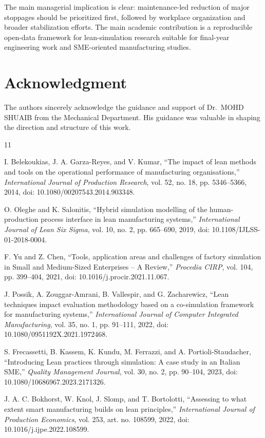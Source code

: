 \documentclass[conference]{IEEEtran}
\begin{document}
The main managerial implication is clear: maintenance-led reduction of major stoppages should be prioritized first, followed by workplace organization and broader stabilization efforts. The main academic contribution is a reproducible open-data framework for lean-simulation research suitable for final-year engineering work and SME-oriented manufacturing studies.

\section*{Acknowledgment}
The authors sincerely acknowledge the guidance and support of Dr.\ MOHD SHUAIB from the Mechanical Department. His guidance was valuable in shaping the direction and structure of this work.

\begin{thebibliography}{11}

I. Belekoukias, J. A. Garza-Reyes, and V. Kumar, ``The impact of lean methods and tools on the operational performance of manufacturing organisations,'' \emph{International Journal of Production Research}, vol. 52, no. 18, pp. 5346--5366, 2014, doi: 10.1080/00207543.2014.903348.

O. Oleghe and K. Salonitis, ``Hybrid simulation modelling of the human-production process interface in lean manufacturing systems,'' \emph{International Journal of Lean Six Sigma}, vol. 10, no. 2, pp. 665--690, 2019, doi: 10.1108/IJLSS-01-2018-0004.

F. Yu and Z. Chen, ``Tools, application areas and challenges of factory simulation in Small and Medium-Sized Enterprises -- A Review,'' \emph{Procedia CIRP}, vol. 104, pp. 399--404, 2021, doi: 10.1016/j.procir.2021.11.067.

J. Possik, A. Zouggar-Amrani, B. Vallespir, and G. Zacharewicz, ``Lean techniques impact evaluation methodology based on a co-simulation framework for manufacturing systems,'' \emph{International Journal of Computer Integrated Manufacturing}, vol. 35, no. 1, pp. 91--111, 2022, doi: 10.1080/0951192X.2021.1972468.

S. Frecassetti, B. Kassem, K. Kundu, M. Ferrazzi, and A. Portioli-Staudacher, ``Introducing Lean practices through simulation: A case study in an Italian SME,'' \emph{Quality Management Journal}, vol. 30, no. 2, pp. 90--104, 2023, doi: 10.1080/10686967.2023.2171326.

J. A. C. Bokhorst, W. Knol, J. Slomp, and T. Bortolotti, ``Assessing to what extent smart manufacturing builds on lean principles,'' \emph{International Journal of Production Economics}, vol. 253, art. no. 108599, 2022, doi: 10.1016/j.ijpe.2022.108599.


\end{thebibliography}
\end{document}
